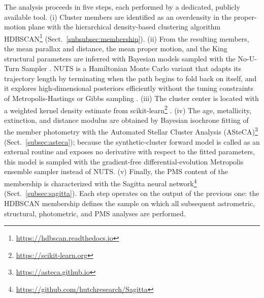 \documentclass{aa}
\begin{document}
The analysis proceeds in five steps, each performed by a dedicated, publicly available tool\@. (i) Cluster members are identified as an overdensity in the proper-motion plane with the hierarchical density-based clustering algorithm HDBSCAN\footnote{\url{https://hdbscan.readthedocs.io}} \citep{10.1007/978-3-642-37456-2_14,McInnes2017} (Sect.~\ref{subsubsec:membership})\@. (ii) From the resulting members, the mean parallax and distance, the mean proper motion, and the King structural parameters are inferred with Bayesian models sampled with the No-U-Turn Sampler \citep[NUTS;][]{2014JMLR...15.1593H}. NUTS is a Hamiltonian Monte Carlo variant that adapts its trajectory length by terminating when the path begins to fold back on itself, and it explores high-dimensional posteriors efficiently without the tuning constraints of Metropolis-Hastings or Gibbs sampling \citep{pymc2023}\@. (iii) The cluster center is located with a weighted kernel density estimate from scikit-learn\footnote{\url{https://scikit-learn.org}} \citep{scikit-learn}\@. (iv) The age, metallicity, extinction, and distance modulus are obtained by Bayesian isochrone fitting of the member photometry with the Automated Stellar Cluster Analysis (ASteCA)\footnote{\url{https://asteca.github.io}} \citep{2015A&A...576A...6P} (Sect.~\ref{subsec:asteca}); because the synthetic-cluster forward model is called as an external routine and exposes no derivative with respect to the fitted parameters, this model is sampled with the gradient-free differential-evolution Metropolis ensemble sampler \citep[DEMetropolis;][]{2006S&C....16..239T} instead of NUTS\@. (v) Finally, the PMS content of the membership is characterized with the Sagitta neural network\footnote{\url{https://github.com/hutchresearch/Sagitta}} \citep{2021AJ....162..282M} (Sect.~\ref{subsec:sagitta}). Each step operates on the output of the previous one: the HDBSCAN membership defines the sample on which all subsequent astrometric, structural, photometric, and PMS analyses are performed.
\end{document}
